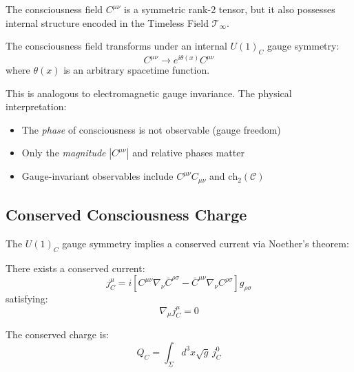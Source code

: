 The consciousness field $C^{\mu\nu}$ is a symmetric rank-2 tensor, but it also possesses internal structure encoded in the Timeless Field $\mathcal{T}_\infty$.

\begin{definition}\label{def:consciousness-gauge}
The consciousness field transforms under an internal $U(1)_C$ gauge symmetry\cite{yang1954,peskin1995}:
\begin{equation}
C^{\mu\nu} \to e^{i\theta(x)} C^{\mu\nu}
\end{equation}
where $\theta(x)$ is an arbitrary spacetime function.
\end{definition}

This is analogous to electromagnetic gauge invariance. The physical interpretation:

\begin{itemize}
\item The \textit{phase} of consciousness is not observable (gauge freedom)
\item Only the \textit{magnitude} $|C^{\mu\nu}|$ and relative phases matter
\item Gauge-invariant observables include $C^{\mu\nu}C_{\mu\nu}$ and $\text{ch}_2(\mathcal{C})$
\end{itemize}

\subsection{Conserved Consciousness Charge}

The $U(1)_C$ gauge symmetry implies a conserved current via Noether's theorem:

\begin{theorem}\label{thm:consciousness-charge-conservation}
There exists a conserved current:
\begin{equation}
\boxed{j^\mu_C = i \left[ C^{\mu\nu} \nabla_\nu \bar{C}^{\rho\sigma} - \bar{C}^{\mu\nu} \nabla_\nu C^{\rho\sigma} \right] g_{\rho\sigma}}
\end{equation}
satisfying:
\begin{equation}
\nabla_\mu j^\mu_C = 0
\end{equation}

The conserved charge is:
\begin{equation}
Q_C = \int_\Sigma d^3x \sqrt{g} \, j^0_C
\end{equation}
\end{theorem}

